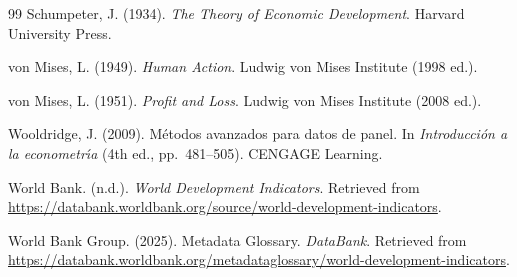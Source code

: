 \documentclass[12pt]{article}
\begin{document}
\begin{thebibliography}{99}
Schumpeter, J. (1934). \textit{The Theory of Economic Development}. Harvard University Press.

von Mises, L. (1949). \textit{Human Action}. Ludwig von Mises Institute (1998 ed.).

von Mises, L. (1951). \textit{Profit and Loss}. Ludwig von Mises Institute (2008 ed.).

Wooldridge, J. (2009). M{\'e}todos avanzados para datos de panel. In \textit{Introducci{\'o}n a la econometr{\'\i}a} (4th ed., pp.~481--505). CENGAGE Learning.

World Bank. (n.d.). \textit{World Development Indicators}. Retrieved from \url{https://databank.worldbank.org/source/world-development-indicators}.

World Bank Group. (2025). Metadata Glossary. \textit{DataBank}. Retrieved from \url{https://databank.worldbank.org/metadataglossary/world-development-indicators}.

\end{thebibliography}

\bigskip
\noindent{}
\end{document}
